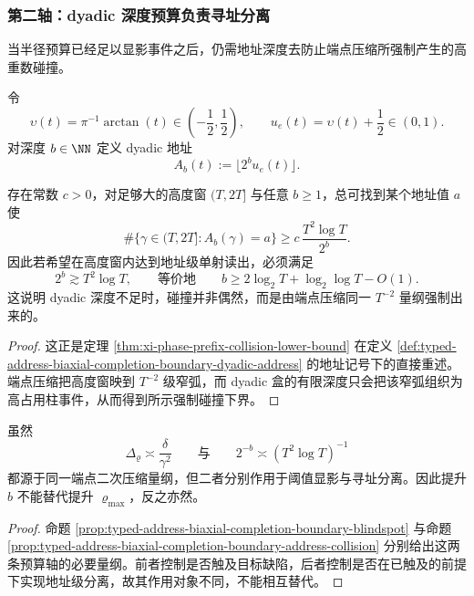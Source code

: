 \subsubsection{第二轴：dyadic 深度预算负责寻址分离}\label{subsubsec:typed-address-biaxial-completion-boundary-dyadic}
当半径预算已经足以显影事件之后，仍需地址深度去防止端点压缩所强制产生的高重数碰撞。

\begin{definition}[dyadic 地址]\label{def:typed-address-biaxial-completion-boundary-dyadic-address}
令
\[
\upsilon(t)=\pi^{-1}\arctan(t)\in\left(-\frac12,\frac12\right),
\qquad
u_e(t)=\upsilon(t)+\frac12\in(0,1).
\]
对深度 \(b\in\NN\) 定义 dyadic 地址
\[
A_b(t):=\lfloor 2^b u_e(t)\rfloor.
\]
\end{definition}

\begin{proposition}[地址碰撞强制律]\label{prop:typed-address-biaxial-completion-boundary-address-collision}
存在常数 \(c>0\)，对足够大的高度窗 \((T,2T]\) 与任意 \(b\ge 1\)，总可找到某个地址值 \(a\) 使
\[
\#\{\gamma\in(T,2T]:A_b(\gamma)=a\}
\ge
c\,\frac{T^2\log T}{2^b}.
\]
因此若希望在高度窗内达到地址级单射读出，必须满足
\[
2^b\gtrsim T^2\log T,
\qquad\text{等价地}\qquad
b\ge 2\log_2 T+\log_2\log T-O(1).
\]
这说明 dyadic 深度不足时，碰撞并非偶然，而是由端点压缩同一 \(T^{-2}\) 量纲强制出来的。
\end{proposition}
\begin{proof}
这正是定理 \ref{thm:xi-phase-prefix-collision-lower-bound} 在定义 \ref{def:typed-address-biaxial-completion-boundary-dyadic-address} 的地址记号下的直接重述。端点压缩把高度窗映到 \(T^{-2}\) 级窄弧，而 dyadic 盒的有限深度只会把该窄弧组织为高占用柱事件，从而得到所示强制碰撞下界。
\end{proof}

\begin{corollary}[深度预算不能替代半径预算]\label{cor:typed-address-biaxial-completion-boundary-depth-not-radius}
虽然
\[
\Delta_{\varrho}\asymp \frac{\delta}{\gamma^2}
\qquad\text{与}\qquad
2^{-b}\asymp (T^2\log T)^{-1}
\]
都源于同一端点二次压缩量纲，但二者分别作用于阈值显影与寻址分离。因此提升 \(b\) 不能替代提升 \(\varrho_{\max}\)，反之亦然。
\end{corollary}
\begin{proof}
命题 \ref{prop:typed-address-biaxial-completion-boundary-blindspot} 与命题 \ref{prop:typed-address-biaxial-completion-boundary-address-collision} 分别给出这两条预算轴的必要量纲。前者控制是否触及目标缺陷，后者控制是否在已触及的前提下实现地址级分离，故其作用对象不同，不能相互替代。
\end{proof}

